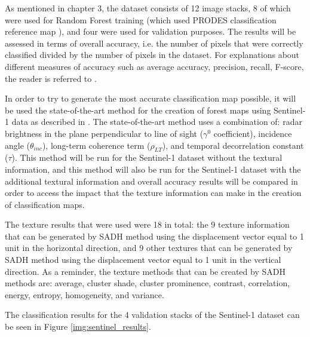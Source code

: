 As mentioned in chapter 3, the dataset consists of 12 image stacks, 8 of which were used for Random Forest training (which used PRODES classification reference map \cite{prodes}), and four were used for validation purposes. The results will be assessed in terms of overall accuracy, i.e. the number of pixels that were correctly classified divided by the number of pixels in the dataset. For explanations about different measures of accuracy such as average accuracy, precision, recall, F-score, the reader is referred to \cite{Book_ML}.

In order to try to generate the most accurate classification map possible, it will be used the state-of-the-art method for the creation of forest maps using Sentinel-1 data as described in \cite{Paolo}. The state-of-the-art method uses a combination of: radar brightness in the plane perpendicular to line of sight ($\gamma^0$ coefficient), incidence angle ($\theta_{inc}$), long-term coherence term ($\rho_{LT}$), and temporal decorrelation constant ($\tau$). This method will be run for the Sentinel-1 dataset without the textural information, and this method will also be run for the Sentinel-1 dataset with the additional textural information and overall accuracy results will be compared in order to access the impact that the texture information can make in the creation of classification maps. 

The texture results that were used were 18 in total: the 9 texture information that can be generated by SADH method using the displacement vector equal to 1 unit in the horizontal direction, and 9 other textures that can be generated by SADH method using the displacement vector equal to 1 unit in the vertical direction. As a reminder, the texture methods that can be created by SADH methods are: average, cluster shade, cluster prominence, contrast, correlation, energy, entropy, homogeneity, and variance.

The classification results for the 4 validation stacks of the Sentinel-1 dataset can be seen in Figure \ref{img:sentinel_results}.

